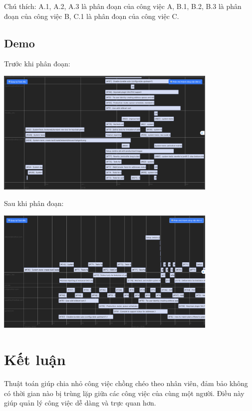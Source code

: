 \documentclass{article}
\begin{document}
    Chú thích: A.1, A.2, A.3 là phân đoạn của công việc A, B.1, B.2, B.3 là phân đoạn của công việc B, C.1 là phân đoạn của công việc C.
\subsection{Demo}
Trước khi phân đoạn:
\begin{center}
    \includegraphics[width=0.8\textwidth]{W3/demo.png}
\end{center}
Sau khi phân đoạn:
\begin{center}
    \includegraphics[width=0.8\textwidth]{W3/demo2.png}
\end{center}
\section{Kết luận}
Thuật toán giúp chia nhỏ công việc chồng chéo theo nhân viên, đảm bảo không có thời gian nào bị trùng lặp giữa các công việc của cùng một người. Điều này giúp quản lý công việc dễ dàng và trực quan hơn.
\end{document}
